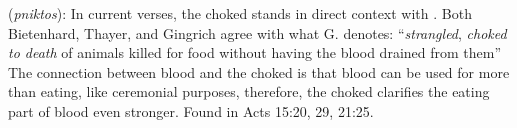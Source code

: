 \item[Choked,]

(\textit{pniktos}):
In current verses, the choked stands in direct context with . Both Bietenhard, Thayer, and Gingrich agree with what G. denotes: ``\emph{strangled}, \emph{choked to death} of animals killed for food without having the blood drained from them'' The connection between blood and the choked is that blood can be used for more than eating, like ceremonial purposes, therefore, the choked clarifies the eating part of blood even stronger.
Found in Acts 15:20, 29, 21:25.
